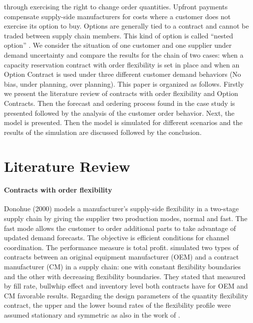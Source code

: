 \documentclass[12pt,english]{article}
\begin{document}
through exercising the right to change order quantities.%
Upfront payments
compensate supply-side manufacturers for costs where a customer does
not exercise its option to buy. Options are generally tied to a contract
and cannot be traded between supply chain members. This kind of option
is called \textquotedblleft nested option\textquotedblright{} \citep{Wang2011a}.
We consider the situation of one customer and one supplier under demand
uncertainty and compare the results for the chain of two cases: when
a capacity reservation contract with order flexibility is set in place
and when an Option Contract is used under three different customer
demand behaviors (No bias, under planning, over planning). This paper
is organized as follows. Firstly
we present the literature review of contracts with order flexibility
and Option Contracts. Then the forecast and ordering process found
in the case study is presented followed by the analysis of the customer
order behavior. Next, the model is presented. Then the model is simulated
for different scenarios and the results of the simulation are discussed
followed by the conclusion. 

\section{Literature Review}

\paragraph{Contracts with order flexibility}

Donohue (2000) models a manufacturer\textquoteright s supply-side
flexibility in a two-stage supply chain by giving the supplier two
production modes, normal and fast. The fast mode allows the customer
to order additional parts to take advantage of updated demand forecasts.
The objective is efficient conditions for channel coordination. The
performance measure is total profit. \citet{Walsh2008} simulated
two types of contracts between an original equipment manufacturer
(OEM) and a contract manufacturer (CM) in a supply chain: one with
constant flexibility boundaries and the other with decreasing flexibility
boundaries. They stated that measured by fill rate, bullwhip effect
and inventory level both contracts have for OEM and CM favorable results.
Regarding the design parameters of the quantity flexibility contract,
the upper and the lower bound rates of the flexibility profile were
assumed stationary and symmetric as also in the work of \citet{BassokAnupindi2008}.
\end{document}
